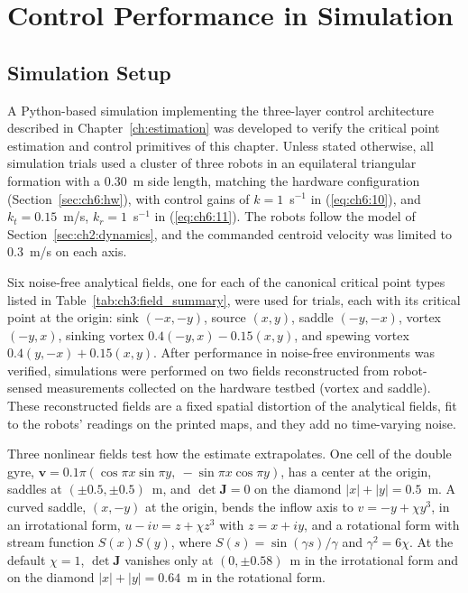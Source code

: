 \section{Control Performance in Simulation}
\label{sec:ch6:sim}

\subsection{Simulation Setup}
\label{sec:ch6:sim_setup}

A Python-based simulation implementing the three-layer control architecture described in Chapter~\ref{ch:estimation} was developed to verify the critical point estimation and control primitives of this chapter. Unless stated otherwise, all simulation trials used a cluster of three robots in an equilateral triangular formation with a 0.30~m side length, matching the hardware configuration (Section~\ref{sec:ch6:hw}), with control gains of $k = 1$~s$^{-1}$ in (\ref{eq:ch6:10}), and $k_t = 0.15$~m/s, $k_r = 1$~s$^{-1}$ in (\ref{eq:ch6:11}). The robots follow the model of Section~\ref{sec:ch2:dynamics}, and the commanded centroid velocity was limited to 0.3~m/s on each axis.

Six noise-free analytical fields, one for each of the canonical critical point types listed in Table~\ref{tab:ch3:field_summary}, were used for trials, each with its critical point at the origin: sink $(-x,-y)$, source $(x,y)$, saddle $(-y,-x)$, vortex $(-y,x)$, sinking vortex $0.4(-y,x)-0.15(x,y)$, and spewing vortex $0.4(y,-x)+0.15(x,y)$. After performance in noise-free environments was verified, simulations were performed on two fields reconstructed from robot-sensed measurements collected on the hardware testbed (vortex and saddle). These reconstructed fields are a fixed spatial distortion of the analytical fields, fit to the robots' readings on the printed maps, and they add no time-varying noise.

Three nonlinear fields test how the estimate extrapolates. One cell of the double gyre, $\mathbf{v} = 0.1\pi(\cos\pi x \sin\pi y,\allowbreak\ -\sin\pi x \cos\pi y)$, has a center at the origin, saddles at $(\pm 0.5, \pm 0.5)$~m, and $\det\mathbf{J} = 0$ on the diamond $|x| + |y| = 0.5$~m. A curved saddle, $(x, -y)$ at the origin, bends the inflow axis to $v = -y + \chi y^3$, in an irrotational form, $u - iv = z + \chi z^3$ with $z = x + iy$, and a rotational form with stream function $S(x)S(y)$, where $S(s) = \sin(\gamma s)/\gamma$ and $\gamma^2 = 6\chi$. At the default $\chi = 1$, $\det\mathbf{J}$ vanishes only at $(0, \pm 0.58)$~m in the irrotational form and on the diamond $|x| + |y| = 0.64$~m in the rotational form.

